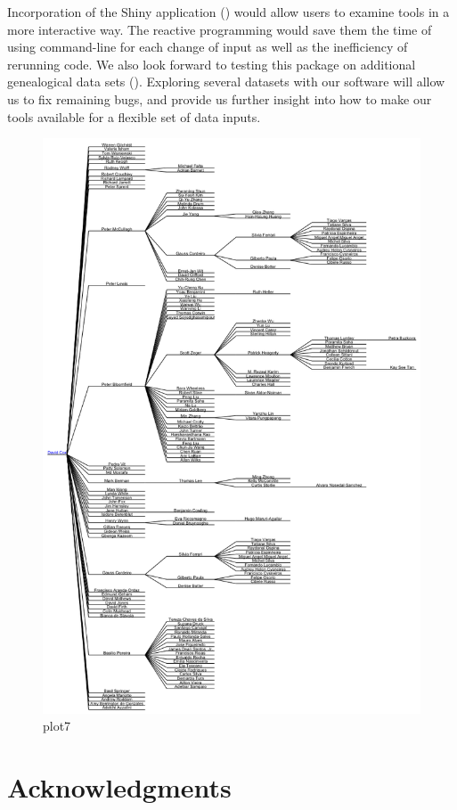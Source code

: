 \documentclass[article,shortnames]{jss}
\begin{document}
Incorporation of the Shiny application (\citealt{shiny}) would allow users to examine  tools in a more interactive way. The reactive programming would save them the time of using command-line for each change of input as well as the inefficiency of rerunning code. We also look forward to testing this package on additional genealogical data sets (\citealt{mgp}). Exploring several datasets with our software will allow us to fix remaining bugs, and provide us further insight into how to make our tools available for a flexible set of data inputs.

\begin{figure}%
    \centering
    \includegraphics[width=\textwidth]{dCox.png}
    \caption{plot7}
    \label{fig:dCox}
\end{figure}

\section*{Acknowledgments} %


\end{document}
